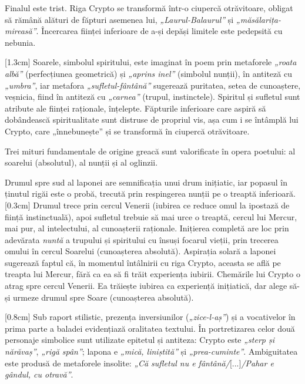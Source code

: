 Finalul este trist. Riga Crypto se transformă într-o ciupercă otrăvitoare, obligat să rămână alături de făpturi asemenea lui, \textit{„Laurul-Balaurul”} și \textit{„măsălarița-mireasă”}. Încercarea ființei inferioare de a-și depăși limitele este pedepsită cu nebunia.

[1.3cm]
Soarele, simbolul spiritului, este imaginat în poem prin metaforele \textit{„roata albă”} (perfecțiunea geometrică) și \textit{„aprins inel”} (simbolul nunții), în antiteză cu \textit{„umbra”}, iar metafora \textit{„sufletul-fântână”} sugerează puritatea, setea de cunoaștere, veșnicia, fiind în antiteză cu \textit{„carnea”} (trupul, instinctele). Spiritul și sufletul sunt atribute ale ființei raționale, înțelepte. Făpturile inferioare care aspiră să dobândească spiritualitate sunt distruse de propriul vis, așa cum i se întâmplă lui Crypto, care „înnebunește” și se transformă în ciupercă otrăvitoare.

Trei mituri fundamentale de origine greacă sunt valorificate în opera poetului: al soarelui (absolutul), al nunții și al oglinzii.

Drumul spre sud al laponei are semnificația unui drum inițiatic, iar popasul în ținutul rigăi este o probă, trecută prin respingerea nunții pe o treaptă inferioară.
[0.3cm]
Drumul trece prin cercul Venerii (iubirea ce reduce omul la ipostază de ființă instinctuală), apoi sufletul trebuie să mai urce o treaptă, cercul lui Mercur, mai pur, al intelectului, al cunoașterii raționale. Inițierea completă are loc prin adevărata \textit{nuntă} a trupului și spiritului cu însuși focarul vieții, prin trecerea omului în cercul Soarelui (cunoașterea absolută). Aspirația solară a laponei sugerează faptul că, în momentul întâlnirii cu riga Crypto, aceasta se află pe treapta lui Mercur, fără ca ea să fi trăit experiența iubirii. Chemările lui Crypto o atrag spre cercul Venerii. Ea trăiește iubirea ca experiență inițiatică, dar alege să-și urmeze drumul spre Soare (cunoașterea absolută).

[0.8cm]
Sub raport stilistic, prezența inversiunilor (\textit{„zice-l-aș”}) și a vocativelor în prima parte a baladei evidențiază oralitatea textului. În portretizarea celor două personaje simbolice sunt utilizate epitetul și antiteza: Crypto este \textit{„sterp și nărăvaș”}, \textit{„rigă spân”}; lapona e \textit{„mică, liniștită”} și \textit{„prea-cuminte”}. Ambiguitatea este produsă de metaforele insolite: \textit{„Că sufletul nu e fântână/}[...]\textit{/Pahar e gândul, cu otravă”}.

